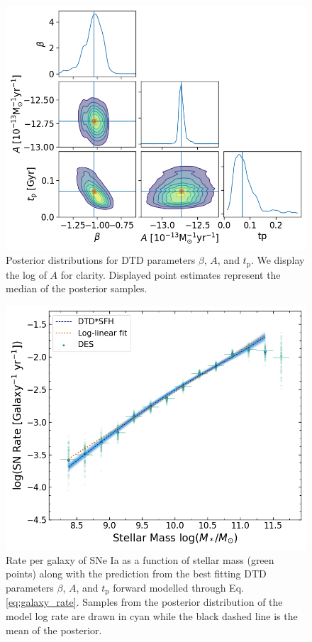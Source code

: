 \documentclass[fleqn,usenatbib]{mnras}
\begin{document}
\begin{figure}
    \centering
    \includegraphics[width=.5\textwidth]{figs/beta_A_tp_Qerf1.1_corner.png}
    \caption{Posterior distributions for DTD parameters $\beta$, $A$, and $t_{\mathrm{p}}$. We display the log of $A$ for clarity. Displayed point estimates represent the median of the posterior samples.
    \label{fig:corner_beta_norm_tp}}
\end{figure}


\begin{figure}
    \centering
    \includegraphics[width=.5\textwidth]{figs/rate_vs_mass_DTD_fit_beta_norm_Qerf1.1.png}
    \caption{Rate per galaxy of SNe Ia as a function of stellar mass (green points) along with the prediction from the best fitting DTD parameters $\beta$, $A$, and $t_{\mathrm{p}}$ forward modelled through Eq. \ref{eq:galaxy_rate}. Samples from the posterior distribution of the model log rate are drawn in cyan while the black dashed line is the mean of the posterior.%
    \label{fig:rate_fitted}}
\end{figure}
\end{document}
